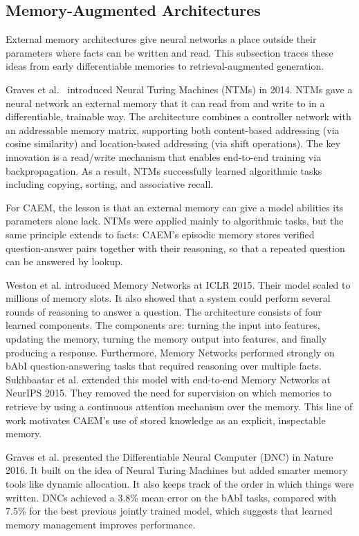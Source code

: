 \subsection{Memory-Augmented Architectures}

External memory architectures give neural networks a place outside their parameters where facts can be written and read. This subsection traces these ideas from early differentiable memories to retrieval-augmented generation.

Graves et al.\ \cite{graves2014neural} introduced Neural Turing Machines (NTMs) in 2014. NTMs gave a neural network an external memory that it can read from and write to in a differentiable, trainable way. The architecture combines a controller network with an addressable memory matrix, supporting both content-based addressing (via cosine similarity) and location-based addressing (via shift operations). The key innovation is a read/write mechanism that enables end-to-end training via backpropagation. As a result, NTMs successfully learned algorithmic tasks including copying, sorting, and associative recall.

For CAEM, the lesson is that an external memory can give a model abilities its parameters alone lack. NTMs were applied mainly to algorithmic tasks, but the same principle extends to facts: CAEM's episodic memory stores verified question-answer pairs together with their reasoning, so that a repeated question can be answered by lookup.

Weston et al. \cite{weston2015memory} introduced Memory Networks at ICLR 2015. Their model scaled to millions of memory slots. It also showed that a system could perform several rounds of reasoning to answer a question. The architecture consists of four learned components. The components are: turning the input into features, updating the memory, turning the memory output into features, and finally producing a response. Furthermore, Memory Networks performed strongly on bAbI question-answering tasks that required reasoning over multiple facts. Sukhbaatar et al. \cite{NIPS2015_8fb21ee7} extended this model with end-to-end Memory Networks at NeurIPS 2015. They removed the need for supervision on which memories to retrieve by using a continuous attention mechanism over the memory. This line of work motivates CAEM's use of stored knowledge as an explicit, inspectable memory.

Graves et al. \cite{graves2016differentiable} presented the Differentiable Neural Computer (DNC) in Nature 2016. It built on the idea of Neural Turing Machines but added smarter memory tools like dynamic allocation. It also keeps track of the order in which things were written. DNCs achieved a 3.8\% mean error on the bAbI tasks, compared with 7.5\% for the best previous jointly trained model, which suggests that learned memory management improves performance.

